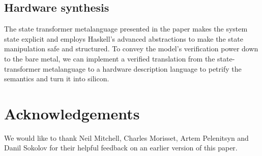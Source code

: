 \subsection{Hardware synthesis}

The state transformer metalanguage presented in the paper makes the system
state explicit and employs Haskell's advanced abstractions to make the
state manipulation safe and structured. To convey the model's verification
power down to the bare metal, we can implement a verified translation from the
state-transformer metalanguage to a hardware description language to petrify
the semantics and turn it into silicon.


\section*{Acknowledgements}
We would like to thank Neil Mitchell, Charles Morisset, Artem Pelenitsyn and
Danil Sokolov for their helpful feedback on an earlier version of this paper.
